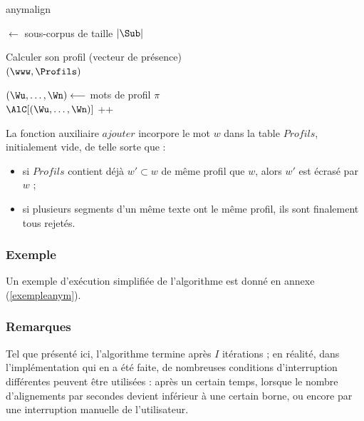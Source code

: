 \documentclass[a4paper,10pt]{article}
\begin{document}
\begin{algorithm}
\caption{anymalign \label{algoanym}}
             


\Debut
{
	{
		\Sub $\leftarrow$ sous-corpus de taille $|\Sub|$

		{
			{
				Calculer son profil (vecteur de présence) \\
				\ajouter$(\www,\Profils)$
			}

			{
				$(\Wu,\dots,\Wn) \longleftarrow$ mots de profil $\pi$ \\
				$\AlC[(\Wu,\dots,\Wn)]$ ++
			}
		}
	}
	\Retour \AlC
}
\end{algorithm}

La fonction auxiliaire $ajouter$ incorpore le mot $w$ dans la table $Profils$, initialement vide, de telle sorte que :

\begin{itemize}
\item si $Profils$ contient déjà $w'\subset w$ de même profil que $w$, alors $w'$ est écrasé par $w$ ;
\item si plusieurs segments d'un même texte ont le même profil, ils sont finalement tous rejetés.
\end{itemize}

\subsubsection{Exemple}

Un exemple d'exécution simplifiée de l'algorithme est donné en annexe (\ref{exempleanym}).

\subsubsection{Remarques}

Tel que présenté ici, l'algorithme termine après $I$ itérations ; en réalité, dans l'implémentation qui en a été faite, de nombreuses conditions d'interruption différentes peuvent être utilisées : après un certain temps, lorsque le nombre d'alignements par secondes devient inférieur à une certain borne, ou encore par une interruption manuelle de l'utilisateur.
\end{document}
